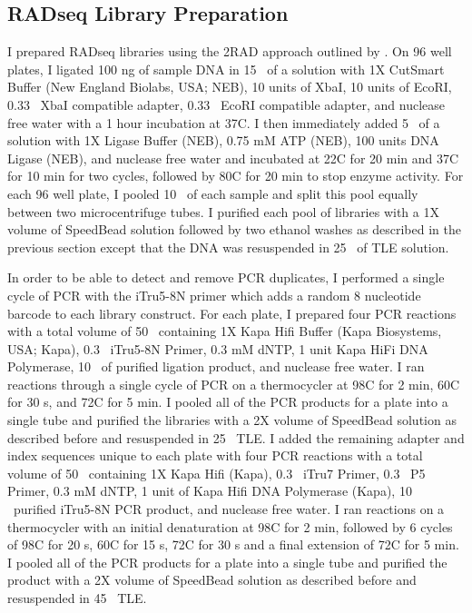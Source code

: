 \subsection{RADseq Library Preparation}
I prepared RADseq libraries using the 2RAD approach outlined by \cite{bayona-vasquez2019}. 
On 96 well plates, I ligated 100 ng of sample DNA in 15 \uL\ of a solution with 
1X CutSmart Buffer (New England Biolabs, USA; NEB), 10 units of XbaI,
10 units of EcoRI, 0.33 \uM\ XbaI compatible adapter, 0.33 \uM\ EcoRI compatible adapter,
and nuclease free water with a 1 hour incubation at 37\degree C. 
I then immediately added 5 \uL\ of a solution with 1X Ligase Buffer (NEB),
0.75 mM ATP (NEB), 100 units DNA Ligase (NEB), and nuclease free water 
and incubated at 22\degree C for 20 min and 37\degree C for 10 min for two cycles, 
followed by 80\degree C for 20 min to stop enzyme activity.
For each 96 well plate, I pooled 10 \uL\ of each sample and split this pool 
equally between two microcentrifuge tubes.
I purified each pool of libraries with a 1X volume of SpeedBead solution followed 
by two ethanol washes as described in the previous section except that the DNA 
was resuspended in 25 \uL\ of TLE solution. 

In order to be able to detect and remove PCR duplicates, I performed a single   
cycle of PCR with the iTru5-8N primer which adds a random 8 nucleotide barcode to 
each library construct.  
For each plate, I prepared four PCR reactions with a total volume of 
50 \uL\ containing 1X Kapa Hifi Buffer (Kapa Biosystems, USA; Kapa),
0.3 \uM\ iTru5-8N Primer, 0.3 mM dNTP, 1 unit Kapa HiFi DNA Polymerase,
10 \uL\ of purified ligation product, and nuclease free water.
I ran reactions through a single cycle of PCR on a thermocycler at 98\degree C for 2 min, 
60\degree C for 30 s, and 72\degree C for 5 min. 
I pooled all of the PCR products for a plate into a single tube and purified the
libraries with a 2X volume of SpeedBead solution as described before and 
resuspended in 25 \uL\ TLE.
I added the remaining adapter and index sequences unique to each plate with four PCR
reactions with a total volume of 50 \uL\ containing 1X Kapa Hifi (Kapa),
0.3 \uM\ iTru7 Primer, 0.3 \uM\ P5 Primer, 0.3 mM dNTP, 1 unit of Kapa Hifi DNA Polymerase (Kapa),
10 \uL\ purified iTru5-8N PCR product, and nuclease free water.
I ran reactions on a thermocycler with an initial denaturation at 98\degree C for 2 min, 
followed by 6 cycles of 98\degree C for 20 s, 60\degree C for 15 s, 72\degree C 
for 30 s and a final extension of 72\degree C for 5 min.
I pooled all of the PCR products for a plate into a single tube and purified the
product with a 2X volume of SpeedBead solution as described before and 
resuspended in 45 \uL\ TLE.

